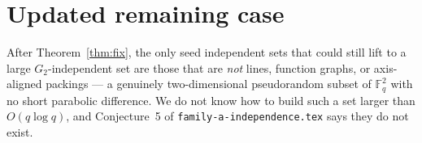 \documentclass[11pt]{article}
\theoremstyle{definition}
\newcommand{\F}{\mathbb{F}}
\begin{document}
\section{Updated remaining case}

After Theorem~\ref{thm:fix}, the only seed independent sets that could still lift to a large $G_2$-independent set are those that are \emph{not} lines, function graphs, or axis-aligned packings --- a genuinely two-dimensional pseudorandom subset of $\F_q^{2}$ with no short parabolic difference.
We do not know how to build such a set larger than $O(q\log q)$, and Conjecture~5 of \texttt{family-a-independence.tex} says they do not exist.
\end{document}

